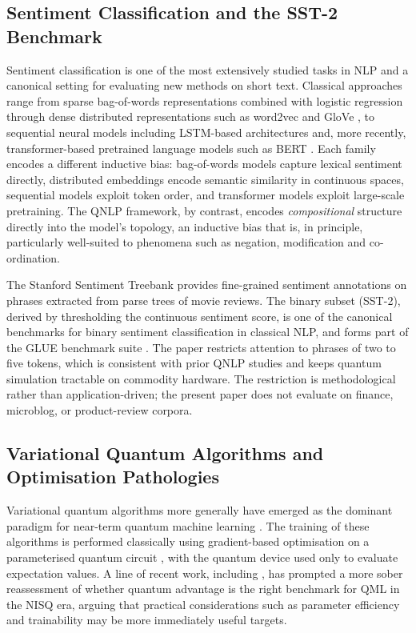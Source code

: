 \documentclass[11pt, a4paper]{article}
\begin{document}
\subsection{Sentiment Classification and the SST-2 Benchmark}

Sentiment classification is one of the most extensively studied tasks
in NLP and a canonical setting for evaluating new methods on short
text. Classical approaches range from sparse bag-of-words representations
combined with logistic regression \citep{scikit2011} through dense
distributed representations such as word2vec \citep{mikolov2013} and
GloVe \citep{pennington2014}, to sequential neural models including
LSTM-based architectures \citep{hochreiter1997} and, more recently,
transformer-based pretrained language models such as BERT
\citep{devlin2019bert}. Each family encodes a different inductive
bias: bag-of-words models capture lexical sentiment directly,
distributed embeddings encode semantic similarity in continuous
spaces, sequential models exploit token order, and transformer models
exploit large-scale pretraining. The QNLP framework, by contrast,
encodes \emph{compositional} structure directly into the model's
topology, an inductive bias that is, in principle, particularly
well-suited to phenomena such as negation, modification and
co-ordination.

The Stanford Sentiment Treebank \citep{socher2013} provides
fine-grained sentiment annotations on phrases extracted from parse
trees of movie reviews. The binary subset (SST-2), derived by
thresholding the continuous sentiment score, is one of the canonical
benchmarks for binary sentiment classification in classical NLP, and
forms part of the GLUE benchmark suite \citep{wang2018glue}. The
paper restricts attention to phrases of two to five tokens,
which is consistent with prior QNLP studies \citep{lorenz2021} and
keeps quantum simulation tractable on commodity hardware. The
restriction is methodological rather than application-driven; the
present paper does not evaluate on finance, microblog, or
product-review corpora.

\subsection{Variational Quantum Algorithms and Optimisation Pathologies}

Variational quantum algorithms more generally have emerged as the
dominant paradigm for near-term quantum machine learning
\citep{cerezo2021, cerezo2022qml}. The training of these algorithms
is performed classically using gradient-based optimisation on a
parameterised quantum circuit \citep{mitarai2018, schuld2019}, with
the quantum device used only to evaluate expectation values. A line
of recent work, including \citet{schuld2022advantage}, has prompted a
more sober reassessment of whether quantum advantage is the right
benchmark for QML in the NISQ era, arguing that practical considerations
such as parameter efficiency and trainability may be more immediately
useful targets.
\end{document}
